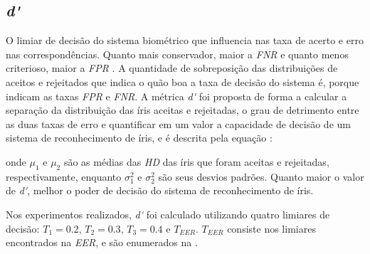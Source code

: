 \FloatBarrier

\subsection{\textit{\acrfull{d'}}}\label{sec:experimentos:daugman}

\par O limiar de decisão do sistema biométrico que influencia nas taxa de acerto e erro nas correspondências. Quanto mais conservador, maior a \textit{\acrshort{FNR}} e quanto menos criterioso, maior a \textit{\acrshort{FPR}} \cite{daugman2000}. A quantidade de sobreposição das distribuições de aceitos e rejeitados que indica o quão boa a taxa de decisão do sistema é, porque indicam as taxas \textit{\acrshort{FPR}} e \textit{\acrshort{FNR}}. A métrica \textit{\acrshort{d'}} foi proposta de forma a calcular a separação da distribuição das íris aceitas e rejeitadas, o grau de detrimento entre as duas taxas de erro e quantificar em um valor a capacidade de decisão de um sistema de reconhecimento de íris, e é descrita pela equação \cite{daugman2000}:


\noindent onde $\mu_{1}$ e $\mu_{2}$ são as médias das \textit{\acrshort{HD}} das íris que foram aceitas e rejeitadas, respectivamente, enquanto $\sigma_{1}^2$ e $\sigma_{2}^2$ são seus desvios padrões. Quanto maior o valor de \textit{\acrshort{d'}}, melhor o poder de decisão do sistema de reconhecimento de íris.

\par Nos experimentos realizados, \textit{\acrshort{d'}} foi calculado utilizando quatro limiares de decisão: $T_{1} = 0.2$, $T_{2} = 0.3$, $T_{3} = 0.4$ e $T_{EER}$. $T_{EER}$ consiste nos limiares encontrados na \textit{\acrshort{EER}}, e são enumerados na .



